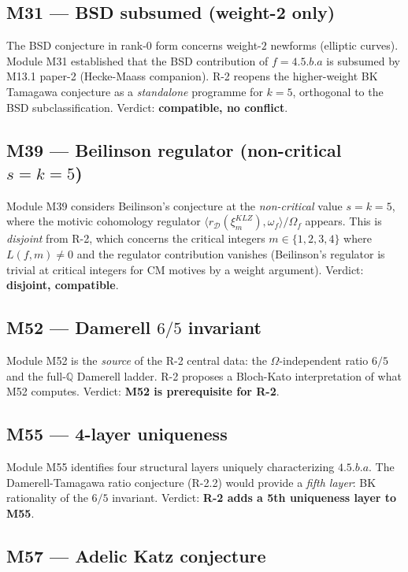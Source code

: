 \documentclass[12pt]{amsart}
\theoremstyle{definition}
\newcommand{\Q}{\mathbb{Q}}
\begin{document}
\subsection{M31 — BSD subsumed (weight-2 only)}

The BSD conjecture in rank-$0$ form concerns weight-$2$ newforms
(elliptic curves). Module M31 established that the BSD contribution
of $f = 4.5.b.a$ is subsumed by M13.1 paper-2 (Hecke-Maass companion).
R-2 reopens the higher-weight BK Tamagawa conjecture as a \emph{standalone}
programme for $k = 5$, orthogonal to the BSD subclassification.
Verdict: \textbf{compatible, no conflict}.

\subsection{M39 — Beilinson regulator (non-critical $s=k=5$)}

Module M39 considers Beilinson's conjecture at the \emph{non-critical}
value $s = k = 5$, where the motivic cohomology regulator
$\langle r_{\mathcal{D}}(\xi_m^{KLZ}), \omega_f \rangle / \Omega_f$
appears. This is \emph{disjoint} from R-2, which concerns the critical
integers $m \in \{1,2,3,4\}$ where $L(f,m) \neq 0$ and the regulator
contribution vanishes (Beilinson's regulator is trivial at critical integers
for CM motives by a weight argument).
Verdict: \textbf{disjoint, compatible}.

\subsection{M52 — Damerell $6/5$ invariant}

Module M52 is the \emph{source} of the R-2 central data:
the $\Omega$-independent ratio $6/5$ and the full-$\Q$ Damerell ladder.
R-2 proposes a Bloch-Kato interpretation of what M52 computes.
Verdict: \textbf{M52 is prerequisite for R-2}.

\subsection{M55 — 4-layer uniqueness}

Module M55 identifies four structural layers uniquely characterizing $4.5.b.a$.
The Damerell-Tamagawa ratio conjecture (R-2.2) would provide a \emph{fifth layer}:
BK rationality of the $6/5$ invariant.
Verdict: \textbf{R-2 adds a 5th uniqueness layer to M55}.

\subsection{M57 — Adelic Katz conjecture}
\end{document}
